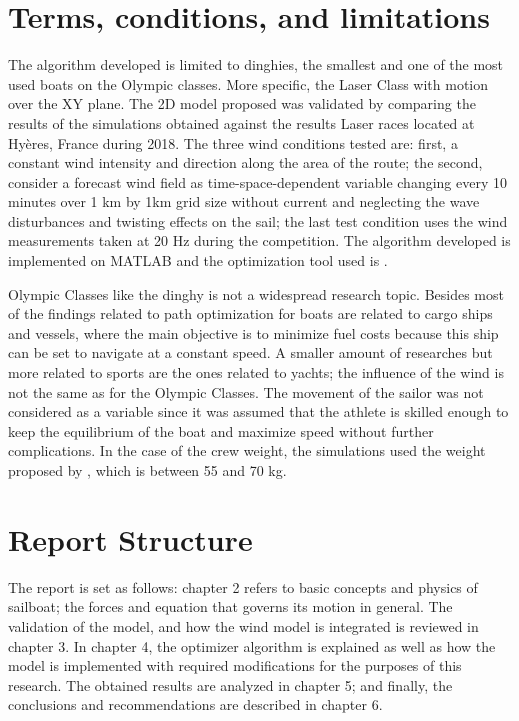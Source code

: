  \section{Terms, conditions, and limitations}
The algorithm developed is limited to dinghies, the smallest and one of the most used boats on the Olympic classes. More specific, the Laser Class with motion over the XY plane.  The 2D model proposed was validated by comparing the results of the simulations obtained against the results Laser races located at Hyères, France during 2018. The three wind conditions tested are: first, a constant wind intensity and direction along the area of the route; the second, consider a forecast wind field as time-space-dependent variable changing every 10 minutes over 1 km by 1km grid size without current and neglecting the wave disturbances and twisting effects on the sail; the last test condition uses the wind measurements taken at 20 Hz during the competition. The algorithm developed is implemented on MATLAB and the optimization tool used is \cite{MatlabOTB}.\par 

Olympic Classes like the dinghy is not a widespread research topic. Besides most of the findings related to path optimization for boats are related to cargo ships and vessels, where the main objective is to minimize fuel costs because this ship can be set to navigate at a constant speed. A smaller amount of researches but more related to sports are the ones related to yachts; the influence of the wind is not the same as for the Olympic Classes. The movement of the sailor was not considered as a variable since it was assumed that the athlete is skilled enough to keep the equilibrium of the boat and  maximize speed without further complications. In the case of the crew weight, the simulations used the weight proposed by \cite{laser_opt}, which is between	55 and 70 kg.\par 

 \section{Report Structure}
The report is set as follows: chapter 2 refers to basic concepts and physics of sailboat; the forces and equation that governs its motion in general. The validation of the model, and how the wind model is integrated is reviewed in chapter 3. In chapter 4, the optimizer algorithm is explained as well as how the model is implemented with required modifications for the purposes of this research. The obtained results are analyzed in chapter 5; and finally, the conclusions and recommendations are described in chapter 6.\par 


